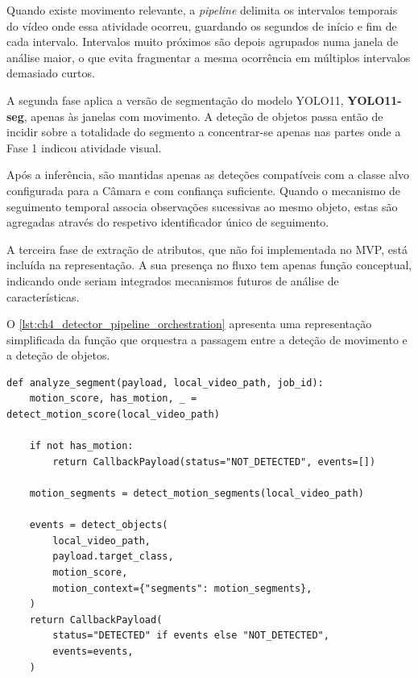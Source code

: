 Quando existe movimento relevante, a \textit{pipeline} delimita os intervalos temporais do vídeo onde essa atividade ocorreu, guardando os segundos de início e fim de cada intervalo. Intervalos muito próximos são depois agrupados numa janela de análise maior, o que evita fragmentar a mesma ocorrência em múltiplos intervalos demasiado curtos.

A segunda fase aplica a versão de segmentação do modelo YOLO11, \textbf{YOLO11-seg}, apenas às janelas com movimento. A deteção de objetos passa então de incidir sobre a totalidade do segmento a concentrar-se apenas nas partes onde a Fase 1 indicou atividade visual.

Após a inferência, são mantidas apenas as deteções compatíveis com a classe alvo configurada para a Câmara e com confiança suficiente. Quando o mecanismo de seguimento temporal associa observações sucessivas ao mesmo objeto, estas são agregadas através do respetivo identificador único de seguimento.

A terceira fase de extração de atributos, que não foi implementada no \gls{MVP}, está incluída na representação. A sua presença no fluxo tem apenas função conceptual, indicando onde seriam integrados mecanismos futuros de análise de características.

O \autoref{lst:ch4_detector_pipeline_orchestration} apresenta uma representação simplificada da função que orquestra a passagem entre a deteção de movimento e a deteção de objetos.

\par\noindent\begin{minipage}{\linewidth}
\begin{lstlisting}[caption={Representação simplificada da orquestração interna da \textit{pipeline} de análise (python)},label={lst:ch4_detector_pipeline_orchestration}]
def analyze_segment(payload, local_video_path, job_id):
    motion_score, has_motion, _ = detect_motion_score(local_video_path)

    if not has_motion:
        return CallbackPayload(status="NOT_DETECTED", events=[])

    motion_segments = detect_motion_segments(local_video_path)

    events = detect_objects(
        local_video_path,
        payload.target_class,
        motion_score,
        motion_context={"segments": motion_segments},
    )
    return CallbackPayload(
        status="DETECTED" if events else "NOT_DETECTED",
        events=events,
    )
\end{lstlisting}
\end{minipage}


